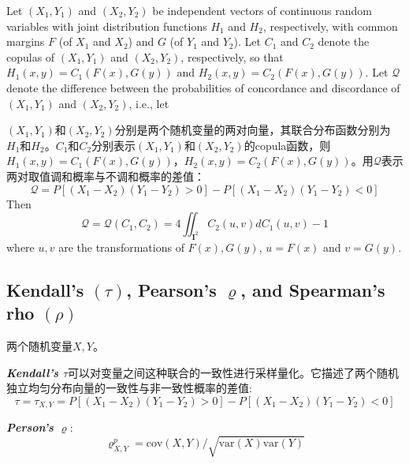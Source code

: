 \begin{theorem}\cite{Bill2000An}
    Let $(X_1,Y_1)$ and $(X_2,Y_2)$ be independent vectors of continuous random variables with joint distribution functions $H_1$ and $H_2$, respectively, with common margins $F$ (of $X_1$ and $X_2$) and $G$ (of $Y_1$ and $Y_2$). Let $C_1$ and $C_2$ denote the copulas of $(X_1,Y_1)$ and $(X_2,Y_2)$, respectively, so that $H_1(x,y) = C_1(F(x), G(y))$ and $H_2(x,y) = C_2(F(x),G(y))$. Let $\mathcal{Q}$ denote the difference between the probabilities of concordance and discordance of $(X_1,Y_1)$ and $(X_2,Y_2)$, i.e., let

    $(X_1,Y_1)$和$(X_2,Y_2)$分别是两个随机变量的两对向量，其联合分布函数分别为$H_1$和$H_2$。$C_1$和$C_2$分别表示$(X_1,Y_1)$和$(X_2,Y_2)$的copula函数，则$H_1(x,y) = C_1(F(x),G(y))$，$H_2(x,y) = C_2(F(x),G(y))$。用$\mathcal{Q}$表示两对取值调和概率与不调和概率的差值：
    \begin{equation}
        \mathcal{Q} = P [(X_1-X_2)(Y_1-Y_2) > 0] - P[(X_1-X_2)(Y_1-Y_2)<0]
        \label{eq-diff}
    \end{equation}
    Then
    \begin{equation}
        \mathcal{Q} = \mathcal{Q}(C_1,C_2) = 4 \iint_{\mathbf{I}^2}C_2(u,v)dC_1(u,v)-1
        \label{eq-diff2}
    \end{equation}
    where $u,v$ are the transformations of $F(x),G(y)$, $u=F(x)$ and $v = G(y)$.
    \label{th5.1.1}
\end{theorem}



\subsection{Kendall's $(\tau)$, Pearson's $\varrho$, and Spearman's rho $(\rho)$}
两个随机变量$X,Y$。

\emph{\textbf{\textcolor[rgb]{1,0,0}{Kendall's $\tau$}}}可以对变量之间这种联合的一致性进行采样量化。它描述了两个随机独立均匀分布向量的一致性与非一致性概率的差值\cite{Montes2015}:
\begin{equation}
    \tau = \tau_{X,Y} = P[(X_1-X_2)(Y_1-Y_2) > 0] - P[(X_1-X_2)(Y_1-Y_2)<0]
    \label{eq-tau}
\end{equation}

\emph{\textbf{\textcolor[rgb]{1,0,0}{Person's $\varrho$}}}:
\begin{equation}   
    \label{eq-varrho}
    \varrho^{p}_{X,Y} = \text{cov}(X,Y)/\sqrt{\text{var}(X)\text{var}(Y)}
\end{equation}


